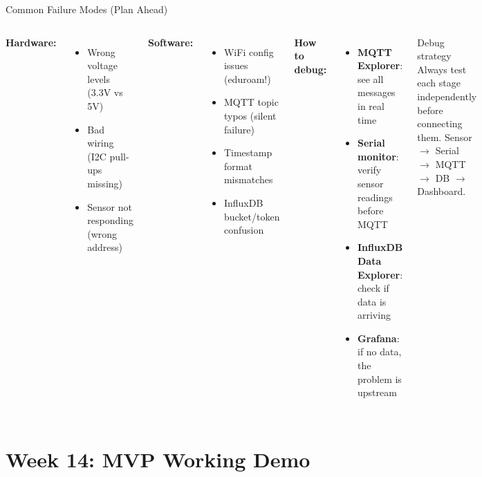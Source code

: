 \documentclass[aspectratio=169,11pt]{beamer}
\begin{document}
\begin{frame}{Common Failure Modes (Plan Ahead)}
    \begin{columns}
        \textbf{Hardware:}
        \begin{itemize}
            \item Wrong voltage levels (3.3V vs 5V)
            \item Bad wiring (I2C pull-ups missing)
            \item Sensor not responding (wrong address)
        \end{itemize}

        \vspace{0.2cm}
        \textbf{Software:}
        \begin{itemize}
            \item WiFi config issues (eduroam!)
            \item MQTT topic typos (silent failure)
            \item Timestamp format mismatches
            \item InfluxDB bucket/token confusion
        \end{itemize}

        \textbf{How to debug:}
        \begin{itemize}
            \item \textbf{MQTT Explorer}: see all messages in real time
            \item \textbf{Serial monitor}: verify sensor readings before MQTT
            \item \textbf{InfluxDB Data Explorer}: check if data is arriving
            \item \textbf{Grafana}: if no data, the problem is upstream
        \end{itemize}

        \vspace{0.2cm}
        \begin{exampleblock}{Debug strategy}
            Always test each stage independently before connecting them. Sensor $\rightarrow$ Serial $\rightarrow$ MQTT $\rightarrow$ DB $\rightarrow$ Dashboard.
        \end{exampleblock}
    \end{columns}
\end{frame}

\section{Week 14: MVP Working Demo}
\end{document}
